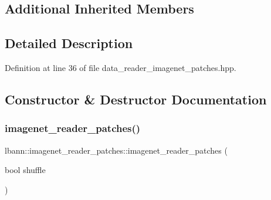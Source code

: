 \subsection*{Additional Inherited Members}


\subsection{Detailed Description}


Definition at line 36 of file data\+\_\+reader\+\_\+imagenet\+\_\+patches.\+hpp.



\subsection{Constructor \& Destructor Documentation}
\mbox{\label{classlbann_1_1imagenet__reader__patches_ab63e39d6e17dfb76b3ccb7df940c862e}} 
\subsubsection{\texorpdfstring{imagenet\+\_\+reader\+\_\+patches()}{imagenet\_reader\_patches()}\hspace{0.1cm}{\footnotesize\ttfamily [1/3]}}
{\footnotesize\ttfamily lbann\+::imagenet\+\_\+reader\+\_\+patches\+::imagenet\+\_\+reader\+\_\+patches (\begin{DoxyParamCaption}\item[{bool}]{shuffle }\end{DoxyParamCaption})\hspace{0.3cm}{\ttfamily [delete]}}

